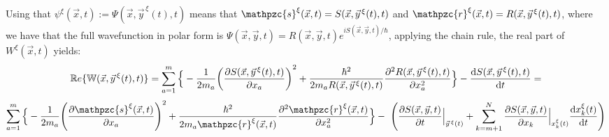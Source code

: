 \documentclass[11pt, a4paper]{article} %
\newcommand{\R}{\mathbb{R}} %
\newcommand{\z}{\mathpzc{s}}
\newcommand{\p}{\mathpzc{r}}
\newcommand{\W}{\mathbb{W}}
\begin{document}

Using that $\psi^\xi ( \vec{x}, t) := \Psi(\vec{x}, \vec{y}^{\, \xi}(t),t)$ means that $\z^\xi(\vec{x},t)=S(\vec{x}, \vec{y}^{\, \xi}(t),t)$ and $\p^\xi (\vec{x},t)=R(\vec{x}, \vec{y}^{\, \xi}(t),t)$, where we have that the full wavefunction in polar form is $\Psi(\vec{x},\vec{y},t)=R(\vec{x},\vec{y},t)e^{iS(\vec{x},\vec{y},t)/\hbar}$, applying the chain rule, the real part of $W^\xi(\vec{x},t)$ yields:
\begin{equation}
\R e\{\W(\vec{x}, \vec{y}^{\, \xi}(t),t)\}=
\sum_{a=1}^m \Big\{-\frac{1}{2m_a} \qty(\pdv{S(\vec{x}, \vec{y}^{\, \xi}(t),t)}{x_a})^2 +\frac{\hbar^2}{2m_aR(\vec{x},\vec{y}^{\, \xi}(t),t)}\pdv[2]{R(\vec{x}, \vec{y}^{\, \xi}(t),t)}{x_a}\Big\}-\dv{S(\vec{x},\vec{y}^{\, \xi}(t),t)}{t}=
\end{equation}
$$
\sum_{a=1}^m\Big\{-\frac{1}{2m_a} \qty(\pdv{\z^\xi(\vec{x},t)}{x_a})^2 +\frac{\hbar^2}{2m_a\p^\xi(\vec{x},t)}\pdv[2]{\p^\xi(\vec{x}, t)}{x_a}\Big\}- \ \qty(\pdv{S(\vec{x},\vec{y},t)}{t}\Big\rvert_{\vec{y}^{\, \xi}(t)}+\sum_{k=m+1}^N \pdv{S(\vec{x},\vec{y},t)}{x_k}\Big\rvert_{x_k^\xi(t)} \dv{x_k^\xi(t)}{t})
$$
\end{document}

